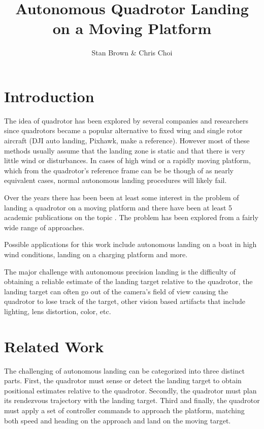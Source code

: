 \documentclass[11pt, twocolumn]{article}
\begin{document}
\title{Autonomous Quadrotor Landing on a Moving Platform}
\author{Stan Brown \& Chris Choi}
\date{}
\maketitle


\section{Introduction}

The idea of quadrotor has been explored by several companies and researchers since quadrotors became a popular alternative to fixed wing and single rotor aircraft (DJI auto landing, Pixhawk, make a reference). However most of these methods usually assume that the landing zone is static and that there is very little wind or disturbances. In cases of high wind or a rapidly moving platform, which from the quadrotor's reference frame can be be though of as nearly equivalent cases, normal autonomous landing procedures will likely fail. 

Over the years there has been been at least some interest in the problem of landing a quadrotor on a moving platform and there have been at least 5 academic publications on the topic \cite{Lee2012, Kim2014, Voos2010, Friis2009, Ling2014, Herisse2012}. The problem has been explored from a fairly wide range of approaches. 

Possible applications for this work include autonomous landing on a boat in high wind conditions, landing on a charging platform and more.

The major challenge with autonomous precision landing is the difficulty of obtaining a reliable estimate of the landing target relative to the quadrotor, the landing target can often go out of the camera's field of view causing the quadrotor to lose track of the target, other vision based artifacts that include lighting, lens distortion, color, etc.


\section{Related Work}
The challenging of autonomous landing can be categorized into three distinct parts. First, the quadrotor must sense or detect the landing target to obtain positional estimates relative to the quadrotor. Secondly, the quadrotor must plan its rendezvous trajectory with the landing target. Third and finally, the quadrotor must apply a set of controller commands to approach the platform, matching both speed and heading on the approach and land on the moving target. 
\end{document}

